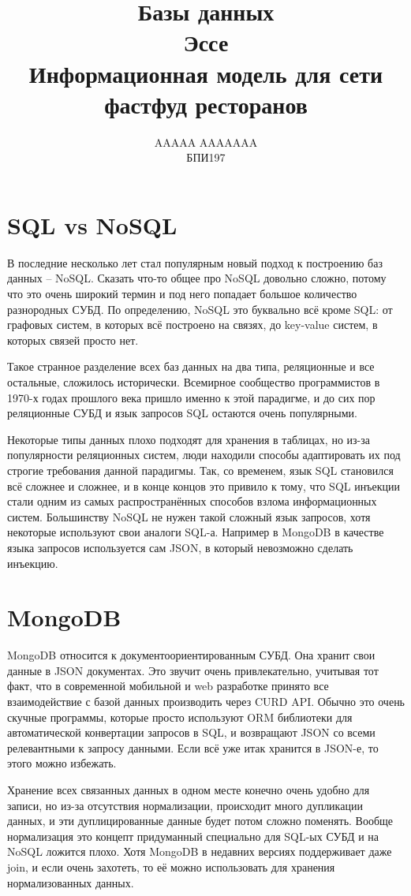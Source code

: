 \documentclass[12pt]{article}
\title{Базы данных \\ Эссе \\ Информационная модель для сети фастфуд ресторанов}
\author{AAAAA AAAAAAA \\ БПИ197}
\begin{document}
  \maketitle

  \section{SQL vs NoSQL}
  В последние несколько лет стал популярным новый подход к построению баз данных -- NoSQL.
  Сказать что-то общее про NoSQL довольно сложно, потому что это очень широкий термин
  и под него попадает большое количество разнородных СУБД.
  По определению, NoSQL это буквально всё кроме SQL:
  от графовых систем, в которых всё построено на связях, до key-value систем, в которых связей просто нет.

  Такое странное разделение всех баз данных на два типа, реляционные и все остальные, сложилось исторически.
  Всемирное сообщество программистов в 1970-х годах прошлого века пришло именно к этой парадигме,
  и до сих пор реляционные СУБД и язык запросов SQL остаются очень популярными.

  Некоторые типы данных плохо подходят для хранения в таблицах, но из-за популярности реляционных систем,
  люди находили способы адаптировать их под строгие требования данной парадигмы.
  Так, со временем, язык SQL становился всё сложнее и сложнее, и в конце концов это привило к тому,
  что SQL инъекции стали одним из самых распространённых способов взлома информационных систем.
  Большинству NoSQL не нужен такой сложный язык запросов, хотя некоторые используют свои аналоги SQL-а.
  Например в MongoDB в качестве языка запросов используется сам JSON, в который невозможно сделать инъекцию.

  \section{MongoDB}
  MongoDB относится к документоориентированным СУБД.
  Она хранит свои данные в JSON документах.
  Это звучит очень привлекательно, учитывая тот факт,
  что в современной мобильной и web разработке принято все взаимодействие с базой данных производить через CURD API.
  Обычно это очень скучные программы, которые просто используют ORM библиотеки для автоматической конвертации запросов в SQL,
  и возвращают JSON со всеми релевантными к запросу данными.
  Если всё уже итак хранится в JSON-е, то этого можно избежать.

  Хранение всех связанных данных в одном месте конечно очень удобно для записи,
  но из-за отсутствия нормализации, происходит много дупликации данных, и эти дуплицированные данные будет потом сложно поменять.
  Вообще нормализация это концепт придуманный специально для SQL-ых СУБД и на NoSQL ложится плохо.
  Хотя MongoDB в недавних версиях поддерживает даже join, и если очень захотеть,
  то её можно использовать для хранения нормализованных данных.
\end{document}
